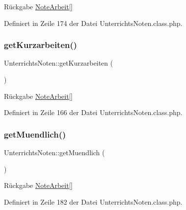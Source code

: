 \begin{DoxyReturn}{Rückgabe}
\mbox{\hyperlink{class_note_arbeit}{Note\+Arbeit}}\mbox{[}\mbox{]} 
\end{DoxyReturn}


Definiert in Zeile 174 der Datei Unterrichts\+Noten.\+class.\+php.

\mbox{\label{class_unterrichts_noten_a1f28c0082644b98f77b9b38d38f40f23}} 
\subsubsection{\texorpdfstring{get\+Kurzarbeiten()}{getKurzarbeiten()}}
{\footnotesize\ttfamily Unterrichts\+Noten\+::get\+Kurzarbeiten (\begin{DoxyParamCaption}{ }\end{DoxyParamCaption})}

\begin{DoxyReturn}{Rückgabe}
\mbox{\hyperlink{class_note_arbeit}{Note\+Arbeit}}\mbox{[}\mbox{]} 
\end{DoxyReturn}


Definiert in Zeile 166 der Datei Unterrichts\+Noten.\+class.\+php.

\mbox{\label{class_unterrichts_noten_a8c1a0c85b7ef4da077ca3cd9b9b098d0}} 
\subsubsection{\texorpdfstring{get\+Muendlich()}{getMuendlich()}}
{\footnotesize\ttfamily Unterrichts\+Noten\+::get\+Muendlich (\begin{DoxyParamCaption}{ }\end{DoxyParamCaption})}

\begin{DoxyReturn}{Rückgabe}
\mbox{\hyperlink{class_note_arbeit}{Note\+Arbeit}}\mbox{[}\mbox{]} 
\end{DoxyReturn}


Definiert in Zeile 182 der Datei Unterrichts\+Noten.\+class.\+php.

\mbox{\label{class_unterrichts_noten_a8f0d6226b8bcf6bd9ac5b15a9eb8b87f}} 
